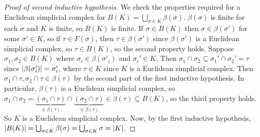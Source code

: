 \begin{proof}[Proof of second inductive hypothesis]
	We check the properties required for a Euclidean simplicial complex for \( B(K) = \bigcup_{\sigma \in K} \beta(\sigma) \).
	\( \beta(\sigma) \) is finite for each \( \sigma \) and \( K \) is finite, so \( B(K) \) is finite.
	If \( \sigma \in B(K) \) then \( \sigma \in \beta(\sigma') \) for some \( \sigma' \in K \), so if \( \tau \in F(\sigma) \), then \( \tau \in \beta(\sigma') \) since \( \beta(\sigma') \) is a Euclidean simplicial complex, so \( \tau \in B(K) \), so the second property holds.
	Suppose \( \sigma_1, \sigma_2 \in B(K) \) where \( \sigma_i \in \beta(\sigma'_i) \) and \( \sigma_i' \in K \).
	Then \( \sigma_1 \cap \sigma_2 \subseteq \sigma_1' \cap \sigma_2' = \tau \) since \( \abs{\beta(\sigma'_i)} = \sigma'_i \), where \( \tau \in K \) since \( K \) is a Euclidean simplicial complex.
	Then \( \sigma_1 \cap \tau, \sigma_2 \cap \tau \in \beta(\tau) \) by the second part of the first inductive hypothesis.
	In particular, \( \beta(\tau) \) is a Euclidean simplicial complex, so \( \sigma_1 \cap \sigma_2 = \underbrace{(\sigma_1 \cap \tau)}_{\in \beta(\tau)} \cap \underbrace{(\sigma_2 \cap \tau)}_{\in \beta(\tau)} \in \beta(\tau) \subseteq B(K) \), so the third property holds.
	So \( K \) is a Euclidean simplicial complex.
	Now, by the first inductive hypothesis, \( \abs{B(K)} = \bigcup_{\sigma \in K} \beta(\sigma) = \bigcup_{\sigma \in K} \sigma = \abs{K} \).
\end{proof}
